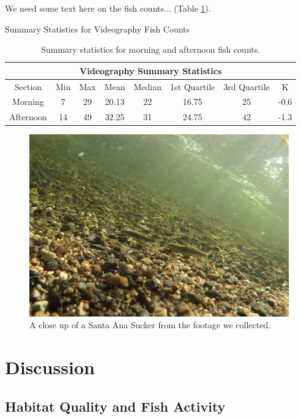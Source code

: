 \documentclass{article}\usepackage[]{graphicx}\usepackage[]{color}
\begin{document}
We need some text here on the fish counts... (Table \ref{tab:fishcounts}).

\begin{table}
\caption{Summary Statistics for Videography Fish Counts}
\begin{tabular}{cccccccc}
 \hline
 \multicolumn{8}{c}{Videography Summary Statistics} \\
 \hline
 Section & Min & Max & Mean & Median & 1st Quartile & 3rd Quartile & K\\
 \hline
 Morning & 7 & 29 & 20.13 & 22  & 16.75 & 25 & -0.6\\
 Afternoon & 14 & 49 & 32.25 & 31 & 24.75 &  42 & -1.3\\
 \hline
\end{tabular}
\caption{Summary statistics for morning and afternoon fish counts.}
\label{tab:fishcounts}
\end{table}


\begin{figure}
\includegraphics[scale=.5]{Videography_figures/reallygoodcrop}
\caption{A close up of a Santa Ana Sucker from the footage we collected.}
\end{figure}

\section{Discussion}

\subsection{Habitat Quality and Fish Activity}
\end{document}
